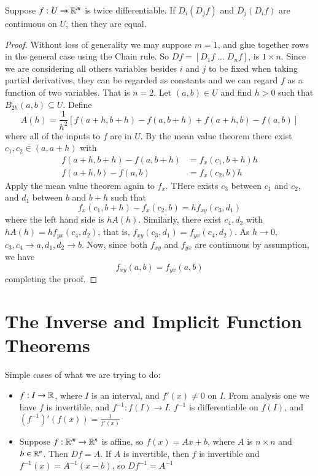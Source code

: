 \begin{proposition}
    Suppose $f:U\rightarrow \mathbb R^m$ is twice differentiable. If $D_i(D_jf)$ and $D_j(D_if)$ are continuous on $U$, then they are equal.
\end{proposition}
\begin{proof}
    Without loss of generality we may suppose $m = 1$, and glue together rows in the general case using the Chain rule. So $Df = [D_1f\;...\;D_nf]$, is $1 \times n$. Since we are considering all others variables besides $i$ and $j$ to be fixed when taking partial derivatives, they can be regarded as constants and we can regard $f$ as a function of two variables. That is $n = 2$. Let $(a,b) \in U$ and find $h > 0$ such that $B_{2h}(a,b) \subseteq U$. Define $$A(h) = \frac{1}{h^2}\left[f(a+h,b+h) - f(a,b+h) + f(a+h,b)-f(a,b)\right]$$ where all of the inputs to $f$ are in $U$. By the mean value theorem there exist $c_1,c_2 \in (a,a+h)$ with \begin{align*}
        f(a+h,b+h)-f(a,b+h) &= f_x(c_1,b+h)h \\
        f(a+h,b) - f(a,b) &= f_x(c_2,b)h
    \end{align*}
    Apply the mean value theorem again to $f_x$. THere exists $c_3$ between $c_1$ and $c_2$, and $d_1$ between $b$ and $b+h$ such that $$f_x(c_1,b+h) - f_x(c_2 ,b) = hf_{xy}(c_3,d_1)$$ where the left hand side is $hA(h)$. Similarly, there exist $c_4,d_2$ with $hA(h) = hf_{yx}(c_4,d_2)$, that is, $f_{xy}(c_3,d_1) = f_{yx}(c_4,d_2)$. As $h\rightarrow 0$, $c_3,c_4\rightarrow a,d_1,d_2\rightarrow b$. Now, since both $f_{xy}$ and $f_{yx}$ are continuous by assumption, we have $$f_{xy}(a,b) = f_{yx}(a,b)$$ completing the proof.
\end{proof}


\section{The Inverse and Implicit Function Theorems}
\label{sec:InvAndImpl}

Simple cases of what we are trying to do: \begin{itemize}
    \item $f:I\rightarrow \mathbb R$, where $I$ is an interval, and $f'(x) \neq 0$ on $I$. From analysis one we have $f$ is invertible, and $f^{-1}:f(I)\rightarrow I$. $f^{-1}$ is differentiable on $f(I)$, and $(f^{-1})'(f(x)) = \frac{1}{f'(x)}$
    \item Suppose $f:\mathbb R^m\rightarrow \mathbb R^n$ is affine, so $f(x) = Ax+b$, where $A$ is $n\times n$ and $b \in \mathbb R^n$. Then $Df = A$. If $A$ is invertible, then $f$ is invertible and $f^{-1}(x) = A^{-1}(x-b)$, so $Df^{-1} = A^{-1}$
\end{itemize}

